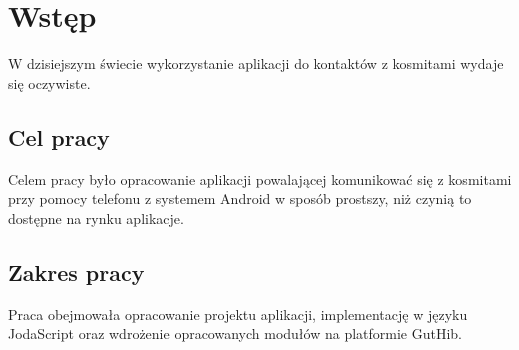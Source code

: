 
\chapter*{Wstęp}

W dzisiejszym świecie wykorzystanie aplikacji do kontaktów z kosmitami wydaje się oczywiste. \lipsum[6]

\section*{Cel pracy}

Celem pracy było opracowanie aplikacji powalającej komunikować się z kosmitami przy pomocy telefonu z systemem Android w sposób prostszy, niż czynią to dostępne na rynku aplikacje. 

\section*{Zakres pracy}

Praca obejmowała opracowanie projektu aplikacji, implementację w języku JodaScript oraz wdrożenie opracowanych modułów na platformie GutHib.